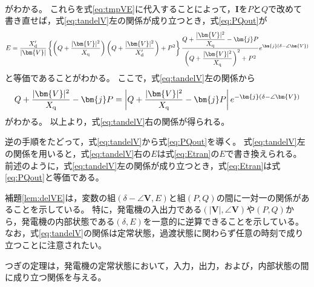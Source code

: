 \documentclass[tombow,dvipdfmx]{corona-a5}
\begin{document}
\begin{証明}
\begin{align*}
\end{align*}
がわかる。
これらを式\ref{eq:tmpVE}に代入することによって，$\bm{I}$を$P$と$Q$で改めて書き直せば，式\ref{eq:tandelV}左の関係が成り立つとき，式\ref{eq:PQout}が
\begin{align}\label{eq:Etran}
E=
\frac{X_{\rm d}'}{|\bm{V}| } 
\left\{
\left(Q + \frac{|\bm{V}|^2}{X_{\rm q}} \right) \left(Q + \frac{|\bm{V}|^2}{X_{\rm d}'} \right) +P^2
\right\}
\frac{  Q + \frac{|\bm{V}|^2}{X_{\rm q}} - \bm{j} P }
{   \left( Q + \frac{|\bm{V}|^2}{X_{\rm q}} \right)^2 + P^2   }
e^{\bm{j}(\delta - \angle \bm{V})}
\end{align}
と等価であることがわかる。
ここで，式\ref{eq:tandelV}左の関係から
\begin{align*}
Q + \frac{|\bm{V}|^2}{X_{\rm q}} - \bm{j} P
= 
\left|Q + \frac{|\bm{V}|^2}{X_{\rm q}} - \bm{j} P \right|
e^{-\bm{j}(\delta - \angle \bm{V})}
\end{align*}
がわかる。
以上より，式\ref{eq:tandelV}右の関係が得られる。

逆の手順をたどって，式\ref{eq:tandelV}から式\ref{eq:PQout}を導く。
式\ref{eq:tandelV}左の関係を用いると，式\ref{eq:tandelV}右の$E$は式\ref{eq:Etran}の$E$で書き換えられる。
前述のように，式\ref{eq:tandelV}左の関係が成り立つとき，式\ref{eq:Etran}は式\ref{eq:PQout}と等価である。
\end{証明}

補題\ref{lem:delVE}は，変数の組$(\delta - \angle \bm{V},E)$と組$(P,Q)$の間に一対一の関係があることを示している。
特に，発電機の入出力である$(|\bm{V}|,\angle \bm{V})$や$(P,Q)$から，発電機の内部状態である$(\delta,E)$を一意的に逆算できることを示している。
なお，式\ref{eq:tandelV}の関係は定常状態，過渡状態に関わらず任意の時刻で成り立つことに注意されたい。

つぎの定理は，発電機の定常状態において，入力，出力，および，内部状態の間に成り立つ関係を与える。
\end{document}
